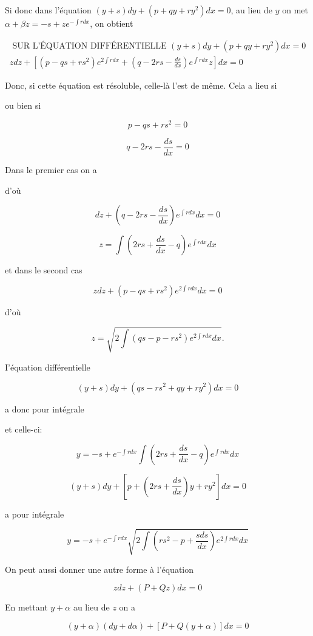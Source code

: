 \documentclass{article}
\begin{document}
Si donc dans l'équation \((y+s) d y+\left(p+q y+r y^{2}\right) d x=0\), au lieu de \(y\) on met \(\alpha+\beta z=-s+z e^{-\int r d x}\), on obtient

\[
\begin{gathered}
\text { SUR L'ÉQUATION DIFFÉRENTIELLE }(y+s) d y+\left(p+q y+r y^{2}\right) d x=0 \\
z d z+\left[\left(p-q s+r s^{2}\right) e^{2 \int r d x}+\left(q-2 r s-\frac{d s}{d x}\right) e^{\int r d x} z\right] d x=0
\end{gathered}
\]

Donc, si cette équation est résoluble, celle-là l'est de même. Cela a lieu si

ou bien si

\[
p-q s+r s^{2}=0
\]

\[
q-2 r s-\frac{d s}{d x}=0
\]

Dans le premier cas on a

d'où

\[
d z+\left(q-2 r s-\frac{d s}{d x}\right) e^{\int r d x} d x=0
\]

\[
z=\int\left(2 r s+\frac{d s}{d x}-q\right) e^{\int r d x} d x
\]

et dans le second cas

\[
z d z+\left(p-q s+r s^{2}\right) e^{2 \int r d x} d x=0
\]

d'où

\[
z=\sqrt{2 \int\left(q s-p-r s^{2}\right) e^{2 \int r d x} d x} .
\]

I'équation différentielle

\[
(y+s) d y+\left(q s-r s^{2}+q y+r y^{2}\right) d x=0
\]

a donc pour intégrale

et celle-ci:

\[
y=-s+e^{-\int r d x} \int\left(2 r s+\frac{d s}{d x}-q\right) e^{\int r d x} d x
\]

\[
(y+s) d y+\left[p+\left(2 r s+\frac{d s}{d x}\right) y+r y^{2}\right] d x=0
\]

a pour intégrale

\[
y=-s+e^{-\int r d x} \sqrt{2 \int\left(r s^{2}-p+\frac{s d s}{d x}\right) e^{2 \int r d x} d x}
\]

On peut aussi donner une autre forme à l'équation

\[
z d z+(P+Q z) d x=0
\]

En mettant \(y+\alpha\) au lieu de \(z\) on a

\[
(y+\alpha)(d y+d \alpha)+[P+Q(y+\alpha)] d x=0
\]
\end{document}
